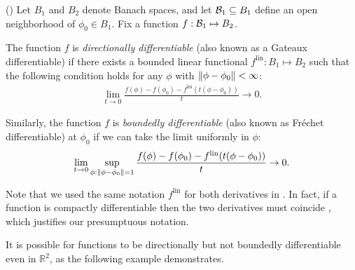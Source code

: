 \begin{defn}
    (\citep[Definition 4.5]{zeidler:2013:functional})
%
Let $B_1$ and $B_2$ denote Banach spaces, and let $\mathcal{B}_1 \subseteq B_1$ define
an open neighborhood of $\phi_0 \in B_1$.  Fix a function $f: \mathcal{B}_1
\mapsto B_2$.

The function $f$ is {\em directionally differentiable} (also known as a Gateaux
differentiable) if there exists a bounded linear functional $f^{\mathrm{lin}}:
B_1 \mapsto B_2$ such that the following condition holds for any
$\phi$ with $\left\Vert\phi - \phi_0\right\Vert < \infty$:
%
\begin{align*}
%
\lim_{t \rightarrow 0}
    \frac{f(\phi) - f(\phi_0) -
          f^{\mathrm{lin}}(t (\phi - \phi_0) )
         }{t} \rightarrow 0.
%
\end{align*}
%

Similarly, the function $f$ is {\em boundedly differentiable} (also known as
Fr{\'echet} differentiable) at $\phi_0$ if we can take the limit uniformly in
$\phi$:
%
\begin{align*}
%
\lim_{t \rightarrow 0}
    \sup_{\phi: \norm{\phi - \phi_0} = 1}
    \frac{f(\phi) - f(\phi_0) -
          f^{\mathrm{lin}}(t (\phi - \phi_0))
         }{t} \rightarrow 0.
%
\end{align*}
%
\end{defn}

Note that we used the same notation $f^{\mathrm{lin}}$ for both derivatives in
.  In fact, if a function is compactly differentiable
then the two derivatives must coincide \citep[Proposition
4.8]{zeidler:2013:functional}, which justifies our presumptuous notation.


It is possible for functions to be directionally but not boundedly
differentiable even in $\mathbb{R}^2$, as the following example demonstrates.

